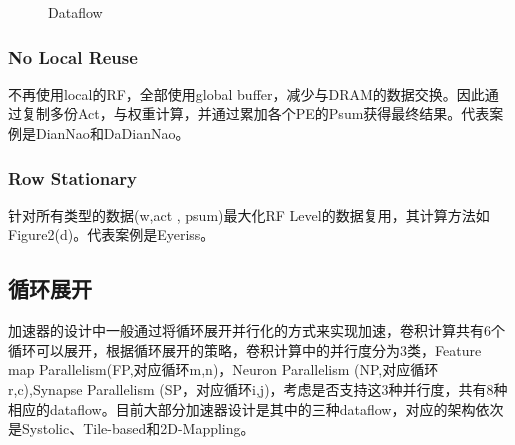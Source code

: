 \documentclass[UTF8]{scrartcl}
\begin{document}
		 	\begin{figure}[h]
		 		\centering
		 		\caption{Dataflow}
		 		\label{fig2}
		 	\end{figure}
		 
		 
		 \subsubsection{No Local Reuse}
		 不再使用local的RF，全部使用global buffer，减少与DRAM的数据交换。因此通过复制多份Act，与权重计算，并通过累加各个PE的Psum获得最终结果。代表案例是DianNao\cite{diannao}和DaDianNao\cite{dadiannao}。
		 \subsubsection{Row Stationary}
		 针对所有类型的数据(w,act , psum)最大化RF Level的数据复用，其计算方法如Figure2(d)。代表案例是Eyeriss\cite{eyeriss}。
	
	  \subsection{循环展开}
		  加速器的设计中一般通过将循环展开并行化的方式来实现加速，卷积计算共有6个循环可以展开，根据循环展开的策略，卷积计算中的并行度分为3类，Feature map Parallelism(FP,对应循环m,n)，Neuron Parallelism (NP,对应循环r,c),Synapse Parallelism (SP，对应循环i,j)，考虑是否支持这3种并行度，共有8种相应的dataflow。目前大部分加速器设计是其中的三种dataflow，对应的架构依次是Systolic、Tile-based和2D-Mappling。
		  
\end{document}
